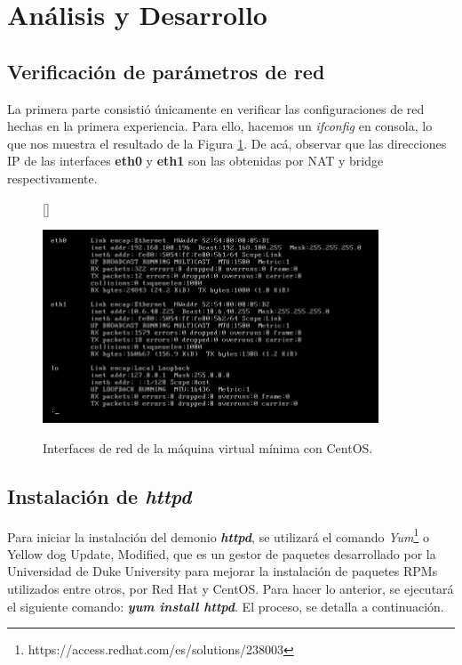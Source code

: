 \documentclass[11pt]{article}
\begin{document}
\section{Análisis y Desarrollo}
\subsection{Verificación de parámetros de red}
La primera parte consistió únicamente en verificar las configuraciones de red hechas en la primera experiencia. Para ello, hacemos un \textit{ifconfig} en consola, lo que nos muestra el resultado de la Figura \ref{fig:interfaces}. De acá, observar que las direcciones IP de las interfaces \textbf{eth0} y \textbf{eth1} son las obtenidas por NAT y bridge respectivamente.\\

\begin{figure}[ht]
[\FBwidth]
{\caption{Interfaces de red de la máquina virtual mínima con CentOS.}\label{fig:interfaces}}
{\includegraphics[width=10cm]{screenshots/ifconfig/ifconfig.png}}
\end{figure}

\newpage
\subsection{Instalación de \textit{httpd}}
Para iniciar la instalación del demonio \textbf{\textit{httpd}}, se utilizará el comando \textit{Yum}\footnote{https://access.redhat.com/es/solutions/238003} o Yellow dog Update, Modified, que es un gestor de paquetes desarrollado por la Universidad de Duke University para mejorar la instalación de paquetes RPMs utilizados entre otros, por Red Hat y CentOS. Para hacer lo anterior, se ejecutará el siguiente comando: \textbf{\textit{yum install httpd}}. El proceso, se detalla a continuación.
 \\[2cm]
\end{document}
